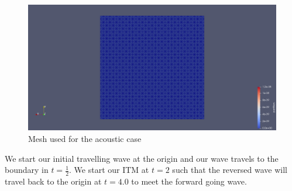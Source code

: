 \begin{figure}
    \centering
    \includegraphics[width=\linewidth]{figures/mesh_cube.png}
    \caption{Mesh used for the acoustic case}
    \label{fig:acoustic_mesh}
\end{figure}

We start our initial travelling wave at the origin and our wave travels to the boundary in $t = \frac{1}{2}$. We start our \ac{ITM} at $t=2$ such that the reversed wave will travel back to the origin at $t=4.0$ to meet the
forward going wave. 

